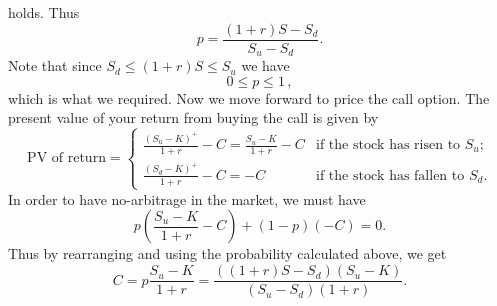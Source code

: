 \documentclass[11pt,a4paper]{article}
\begin{document}
\begin{enumerate}[(a)]
$$        $$
        holds. Thus
        $$
        p = \frac{(1+r)S-S_d}{S_u-S_d}.
        $$
        Note that since $S_d \leq (1 + r)S \leq S_u$ we have
        $$
        0 \leq p \leq 1\, ,
        $$
        which is what we required. Now we move forward to price the call option. The present value of your return from buying the call is given by
        $$
        \text{PV of return}
        =
        \begin{cases}
            \frac{(S_u-K)^+}{1+r}-C = \frac{S_u-K}{1+r}-C & \text{if the stock has risen to $S_u$;}\\
            \frac{(S_d-K)^+}{1+r}-C=-C & \text{if the stock has fallen to $S_d$}.
        \end{cases}
        $$
        In order to have no-arbitrage in the market, we must have
        $$
        p\left(\frac{S_u-K}{1+r}-C\right)+(1-p)(-C)=0.
        $$
        Thus by rearranging and using the probability calculated above, we get
        $$
        C
        = p\frac{S_u-K}{1+r}
        = \frac{((1+r)S-S_d)(S_u-K)}{(S_u-S_d)(1+r)}.
        $$
    \end{enumerate}
\end{document}
